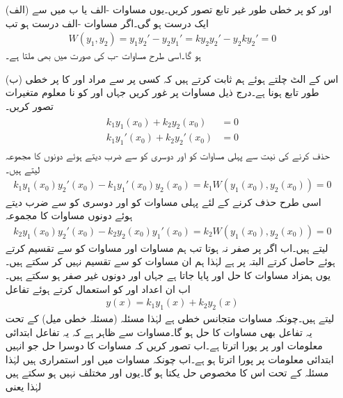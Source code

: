 \begin{enumerate}
\item[(الف)]
 اور  کو  پر خطی طور غیر تابع تصور کریں۔یوں مساوات -الف یا ب میں سے ایک درست ہو گی۔اگر  مساوات -الف  درست ہو تب
\begin{align*}
W(y_1,y_2)=y_1y_2'-y_2y_1'=ky_2y_2'-y_2ky_2'=0
\end{align*}
ہو گا۔اسی طرح مساوات -ب کی صورت میں بھی  ملتا ہے۔
\item[(ب)]
 اس کے الٹ چلتے ہوئے ہم ثابت کرتے ہیں کہ کسی  پر  سے مراد  اور  کا  پر خطی طور تابع ہونا ہے۔درج ذیل مساوات پر غور کریں جہاں  اور  کو نا معلوم متغیرات تصور کریں۔
\begin{gather}
\begin{aligned}\label{مساوات_سادہ_دو_درجی_ثبوت_الف}
k_1y_1(x_0)+k_2y_2(x_0)&=0\\
k_1y_1'(x_0)+k_2y_2'(x_0)&=0
\end{aligned}
\end{gather}
 حذف کرنے کی نیت سے  پہلی مساوات کو  اور دوسری کو  سے ضرب دیتے ہوئے دونوں کا مجموعہ لیتے ہیں۔
\begin{align}\label{مساوات_سادہ_دو_درجی_ثبوت_ب}
k_1y_1(x_0)y_2'(x_0)-k_1y_1'(x_0)y_2(x_0)=k_1W(y_1(x_0),y_2(x_0))=0
\end{align}
اسی طرح  حذف کرنے کے لئے پہلی مساوات کو  اور دوسری کو  سے ضرب دیتے ہوئے دونوں مساوات کا مجموعہ
\begin{align}\label{مساوات_سادہ_دو_درجی_ثبوت_پ}
k_2y_1(x_0)y_2'(x_0)-k_2y_2(x_0)y_1'(x_0)=k_2W(y_1(x_0),y_2(x_0))=0
\end{align}
لیتے ہیں۔اب اگر  پر  صفر نہ ہوتا تب ہم مساوات  اور مساوات  کو  سے تقسیم کرتے ہوئے  حاصل کرتے البتہ  پر  ہے لہٰذا ہم ان مساوات کو  سے  تقسیم نہیں کر سکتے ہیں۔ یوں  ہمزاد مساوات  کا حل  اور  پایا جاتا ہے جہاں  اور  دونوں غیر صفر ہو سکتے ہیں۔ اب ان اعداد  اور  کو استعمال کرتے ہوئے تفاعل
\begin{align}
y(x)=k_1y_1(x)+k_2y_2(x)
\end{align}
لیتے ہیں۔چونکہ مساوات  متجانس خطی ہے لہٰذا  مسئلہ   (مسئلہ خطی میل) کے تحت  یہ تفاعل بھی مساوات  کا حل ہو گا۔مساوات  سے ظاہر ہے کہ یہ تفاعل ابتدائی معلومات  اور  پر پورا اترتا ہے۔اب تصور کریں کہ مساوات  کا دوسرا حل جو انہیں  ابتدائی معلومات پر پورا اترتا ہو  ہے۔اب چونکہ مساوات  میں  اور  استمراری ہیں لہٰذا مسئلہ  کے تحت اس کا مخصوص حل یکتا ہو گا۔یوں  اور  مختلف نہیں ہو سکتے ہیں لہٰذا  یعنی

\end{enumerate}
